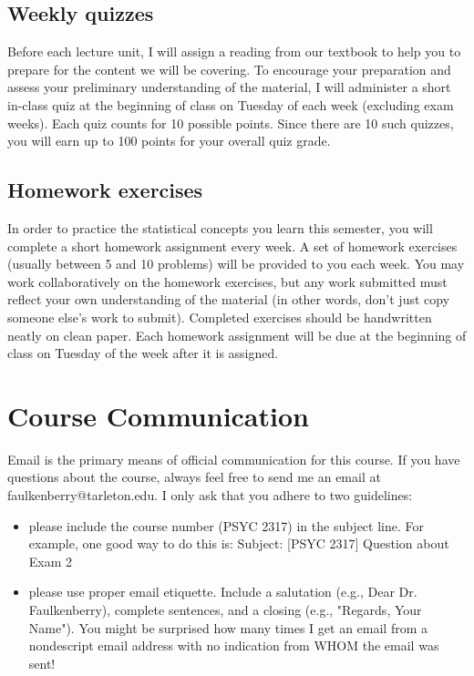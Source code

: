 \documentclass[10pt]{article}
\begin{document}
\subsection*{Weekly quizzes}
\label{sec:org5781df1}
Before each lecture unit, I will assign a reading from our textbook to help you to prepare for the content we will be covering. To encourage your preparation and assess your preliminary understanding of the material, I will administer a short in-class quiz at the beginning of class on Tuesday of each week (excluding exam weeks). Each quiz counts for 10 possible points.  Since there are 10 such quizzes, you will earn up to 100 points for your overall quiz grade.

\subsection*{Homework exercises}
\label{sec:org5922d95}
In order to practice the statistical concepts you learn this semester, you will complete a short homework assignment every week.  A set of homework exercises (usually between 5 and 10 problems) will be provided to you each week.  You may work collaboratively on the homework exercises, but any work submitted must reflect your own understanding of the material (in other words, don't just copy someone else's work to submit).  Completed exercises should be handwritten neatly on clean paper.  Each homework assignment will be due at the beginning of class on Tuesday of the week after it is assigned.

\section*{Course Communication}
\label{sec:org0d24a1b}

Email is the primary means of official communication for this course.  If you have questions about the course, always feel free to send me an email at faulkenberry@tarleton.edu.  I only ask that you adhere to two guidelines:
\begin{itemize}
\item please include the course number (PSYC 2317) in the subject line.  For example, one good way to do this is:  Subject: [PSYC 2317] Question about Exam 2
\item please use proper email etiquette.  Include a salutation (e.g., Dear Dr. Faulkenberry), complete sentences, and a closing (e.g., "Regards, Your Name").  You might be surprised how many times I get an email from a nondescript email address with no indication from WHOM the email was sent!
\end{itemize}
\end{document}
